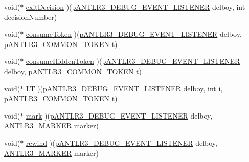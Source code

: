 \begin{DoxyCompactItemize}
void($\ast$ \hyperlink{struct_a_n_t_l_r3___d_e_b_u_g___e_v_e_n_t___l_i_s_t_e_n_e_r__struct_ad4ffe64fde8fdc9577829f6f6921caaa}{exit\-Decision} )(\hyperlink{antlr3interfaces_8h_ab226a624395fcc0b8fe2b29ae60b6116}{p\-A\-N\-T\-L\-R3\-\_\-\-D\-E\-B\-U\-G\-\_\-\-E\-V\-E\-N\-T\-\_\-\-L\-I\-S\-T\-E\-N\-E\-R} delboy, int decision\-Number)
\item 
void($\ast$ \hyperlink{struct_a_n_t_l_r3___d_e_b_u_g___e_v_e_n_t___l_i_s_t_e_n_e_r__struct_aa102c05452b09dc31bde71db7d1cf27b}{consume\-Token} )(\hyperlink{antlr3interfaces_8h_ab226a624395fcc0b8fe2b29ae60b6116}{p\-A\-N\-T\-L\-R3\-\_\-\-D\-E\-B\-U\-G\-\_\-\-E\-V\-E\-N\-T\-\_\-\-L\-I\-S\-T\-E\-N\-E\-R} delboy, \hyperlink{antlr3interfaces_8h_adaa6df9cbf0cd7ab37fd545520ff299b}{p\-A\-N\-T\-L\-R3\-\_\-\-C\-O\-M\-M\-O\-N\-\_\-\-T\-O\-K\-E\-N} \hyperlink{showimage_8m_ad941f6ef920fbfb3d75b60ddbedbdd39}{t})
\item 
void($\ast$ \hyperlink{struct_a_n_t_l_r3___d_e_b_u_g___e_v_e_n_t___l_i_s_t_e_n_e_r__struct_aeebd35a1758f4bd8a1ebe87a754181ec}{consume\-Hidden\-Token} )(\hyperlink{antlr3interfaces_8h_ab226a624395fcc0b8fe2b29ae60b6116}{p\-A\-N\-T\-L\-R3\-\_\-\-D\-E\-B\-U\-G\-\_\-\-E\-V\-E\-N\-T\-\_\-\-L\-I\-S\-T\-E\-N\-E\-R} delboy, \hyperlink{antlr3interfaces_8h_adaa6df9cbf0cd7ab37fd545520ff299b}{p\-A\-N\-T\-L\-R3\-\_\-\-C\-O\-M\-M\-O\-N\-\_\-\-T\-O\-K\-E\-N} \hyperlink{showimage_8m_ad941f6ef920fbfb3d75b60ddbedbdd39}{t})
\item 
void($\ast$ \hyperlink{struct_a_n_t_l_r3___d_e_b_u_g___e_v_e_n_t___l_i_s_t_e_n_e_r__struct_afaf77e7b413b4eb08eac090fc8faf0c0}{L\-T} )(\hyperlink{antlr3interfaces_8h_ab226a624395fcc0b8fe2b29ae60b6116}{p\-A\-N\-T\-L\-R3\-\_\-\-D\-E\-B\-U\-G\-\_\-\-E\-V\-E\-N\-T\-\_\-\-L\-I\-S\-T\-E\-N\-E\-R} delboy, int \hyperlink{_read_d_m3___matlab_8m_a6f6ccfcf58b31cb6412107d9d5281426}{i}, \hyperlink{antlr3interfaces_8h_adaa6df9cbf0cd7ab37fd545520ff299b}{p\-A\-N\-T\-L\-R3\-\_\-\-C\-O\-M\-M\-O\-N\-\_\-\-T\-O\-K\-E\-N} \hyperlink{showimage_8m_ad941f6ef920fbfb3d75b60ddbedbdd39}{t})
\item 
void($\ast$ \hyperlink{struct_a_n_t_l_r3___d_e_b_u_g___e_v_e_n_t___l_i_s_t_e_n_e_r__struct_ac3a29f3c8779cc97c9188f45cdc3d2ec}{mark} )(\hyperlink{antlr3interfaces_8h_ab226a624395fcc0b8fe2b29ae60b6116}{p\-A\-N\-T\-L\-R3\-\_\-\-D\-E\-B\-U\-G\-\_\-\-E\-V\-E\-N\-T\-\_\-\-L\-I\-S\-T\-E\-N\-E\-R} delboy, \hyperlink{antlr3defs_8h_a0361e6bf442e07afe923e4d05e9ebc4f}{A\-N\-T\-L\-R3\-\_\-\-M\-A\-R\-K\-E\-R} marker)
\item 
void($\ast$ \hyperlink{struct_a_n_t_l_r3___d_e_b_u_g___e_v_e_n_t___l_i_s_t_e_n_e_r__struct_a75107200ac78d7991c21b1b303144dff}{rewind} )(\hyperlink{antlr3interfaces_8h_ab226a624395fcc0b8fe2b29ae60b6116}{p\-A\-N\-T\-L\-R3\-\_\-\-D\-E\-B\-U\-G\-\_\-\-E\-V\-E\-N\-T\-\_\-\-L\-I\-S\-T\-E\-N\-E\-R} delboy, \hyperlink{antlr3defs_8h_a0361e6bf442e07afe923e4d05e9ebc4f}{A\-N\-T\-L\-R3\-\_\-\-M\-A\-R\-K\-E\-R} marker)

\end{DoxyCompactItemize}
